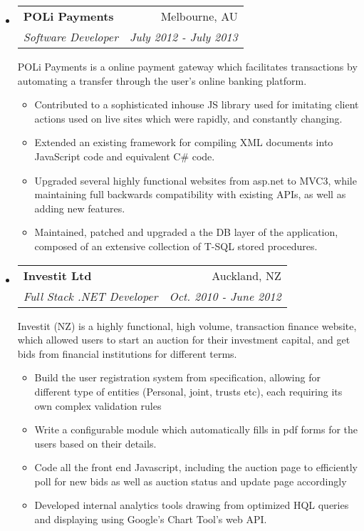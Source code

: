 \documentclass[letterpaper,11pt]{article}
\makeatletter
\newcommand{\resitem}[1]{\item #1 \vspace{-2pt}}
\newcommand{\ressubheading}[4]{
\begin{tabular*}{6.5in}{l@{\cftdotfill{\cftsecdotsep}\extracolsep{\fill}}r}
		\textbf{#1} & #2 \\
		\textit{#3} & \textit{#4} \\
\end{tabular*}\vspace{-6pt}}
\makeatother
\begin{document}
\begin{itemize}
\item
	\ressubheading{POLi Payments}{Melbourne, AU}{Software Developer}{July 2012 - July 2013}
	
	POLi Payments is a online payment gateway which facilitates transactions by automating a transfer through the user's online banking platform. 
	\begin{itemize}
		\resitem{Contributed to a sophisticated inhouse JS library used for imitating client actions used on live sites which were rapidly, and constantly changing.}
		\resitem{Extended an existing framework for compiling XML documents into JavaScript code and equivalent C\# code.}
		\resitem{Upgraded several highly functional websites from asp.net to MVC3, while maintaining full backwards compatibility with existing APIs, as well as adding new features.} 
		\resitem{Maintained, patched and upgraded a the DB layer of the application, composed of an extensive collection of T-SQL stored procedures.}
	\end{itemize}

\vfil \break
	
\item
	\ressubheading{Investit Ltd}{Auckland, NZ}{Full Stack .NET Developer}{Oct. 2010 - June 2012}

	Investit (NZ) is a highly functional, high volume, transaction finance website, which allowed users to start an auction for their investment capital, and get bids from financial institutions for different terms.
	\begin{itemize}
		\resitem{Build the user registration system from specification, allowing for different type of entities (Personal, joint, trusts etc), each requiring its own complex validation rules}
		\resitem{Write a configurable module which automatically fills in pdf forms for the users based on their details.}
		\resitem{Code all the front end Javascript, including the auction page to efficiently poll for new bids as well as auction status and update page accordingly}
		\resitem{Developed internal analytics tools drawing from optimized HQL queries and displaying using Google's Chart Tool's web API.}
	\end{itemize}
\end{itemize}
\end{document}
